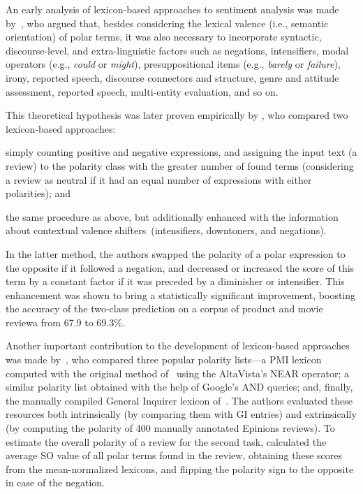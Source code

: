 An early analysis of lexicon-based approaches to sentiment analysis
was made by~\citet{Polanyi:06}, who argued that, besides considering
the lexical valence (i.e., semantic orientation) of polar terms, it
was also necessary to incorporate syntactic, discourse-level, and
extra-linguistic factors such as negations, intensifiers, modal
operators (e.g., \emph{could} or \emph{might}), presuppositional items
(e.g., \emph{barely} or \emph{failure}), irony, reported speech,
discourse connectors and structure, genre and attitude assessment,
reported speech, multi-entity evaluation, and so on.

This theoretical hypothesis was later proven empirically by
\citet{Kennedy:06}, who compared two lexicon-based approaches:
\begin{inparaenum}[(i)]
\item simply counting positive and negative expressions, and assigning
  the input text (a review) to the polarity class with the greater
  number of found terms (considering a review as neutral if it had an
  equal number of expressions with either polarities); and
\item the same procedure as above, but additionally enhanced with the
  information about contextual valence shifters~(intensifiers,
  downtoners, and negations).
\end{inparaenum}
In the latter method, the authors swapped the polarity of a polar
expression to the opposite if it followed a negation, and decreased or
increased the score of this term by a constant factor if it was
preceded by a diminisher or intensifier.  This enhancement was shown
to bring a statistically significant improvement, boosting the
accuracy of the two-class prediction on a corpus of product and movie
reviewa from 67.9 to 69.3\%.

Another important contribution to the development of lexicon-based
approaches was made by~\citet{Taboada:06}, who compared three popular
polarity lists---a PMI lexicon computed with the original method
of~\citet{Turney:02} using the AltaVista's NEAR operator; a similar
polarity list obtained with the help of Google's AND queries; and,
finally, the manually compiled General Inquirer lexicon
of~\citet{Stone:66}.  The authors evaluated these resources both
intrinsically (by comparing them with GI entries) and extrinsically
(by computing the polarity of 400 manually annotated Epinions
reviews).  To estimate the overall polarity of a review for the second
task, \citeauthor{Taboada:06} calculated the average SO value of all
polar terms found in the review, obtaining these scores from the
mean-normalized lexicons, and flipping the polarity sign to the
opposite in case of the negation.

